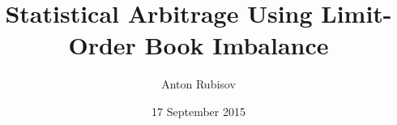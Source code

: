 \title[Arbitrage with Order Imbalance]{Statistical Arbitrage Using Limit-Order Book Imbalance}
\author{Anton Rubisov}
\date{17 September 2015}
\beamertemplatenavigationsymbolsempty

\usepackage{booktabs}
\usepackage[compatibility=false]{caption}
\usepackage{subcaption}
\usepackage{bm} 			%

\DeclareMathOperator{\sgn}{\mathrm{sgn}}
\newcommand{\mat}[1]{\boldsymbol{#1}}
\newcommand{\ra}[1]{\renewcommand{\arraystretch}{#1}}
\newcommand{\bZ}{\bm{Z}}
\newcommand{\bz}{\bm{z}}
\newcommand{\btau}{\bm{\tau}}
\newcommand{\cF}{\mathcal{F}}
